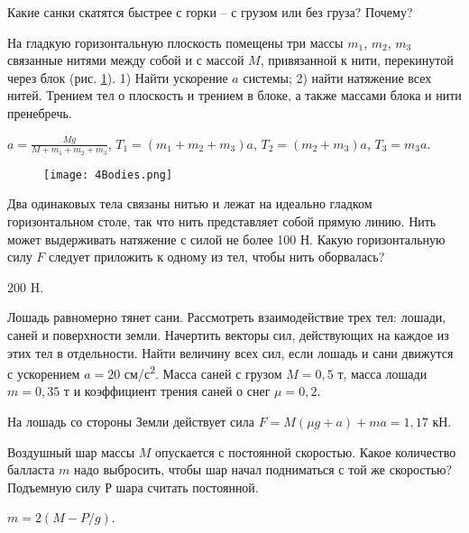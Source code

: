 \begin{ex} %
Какие санки скатятся быстрее с горки -- с грузом или без груза? Почему?
\end{ex}

\simpleProblems

\begin{ex} %
На гладкую горизонтальную плоскость помещены три массы $m_1$, $m_2$, $m_3$ связанные нитями между собой и с массой $M$, привязанной к нити, перекинутой через блок (рис. \ref{4Bodies}). 1) Найти ускорение $a$ системы; 2) найти натяжение всех нитей. Трением тел о плоскость и трением в блоке, а также массами блока и нити пренебречь.
\begin{ans}
$a = \frac{Mg}{M + m_1 +m_2 +m_3}$, $T_1 = (m_1 +m_2 +m_3)a$, $T_2 = (m_2 +m_3)a$, $T_3 = m_3 a$.
\end{ans}
\end{ex}

\begin{figure}[h]
\centering
\texttt{[image: 4Bodies.png]}
\caption{}
\label{4Bodies}
\end{figure}

\begin{ex} %
Два одинаковых тела связаны нитью и лежат на идеально гладком горизонтальном столе, так что нить представляет собой прямую линию. Нить может выдерживать натяжение с силой не более 100 Н. Какую горизонтальную силу $F$ следует приложить к одному из тел, чтобы нить оборвалась?
\begin{ans}
200 H.
\end{ans}
\end{ex}

\begin{ex} %
Лошадь равномерно тянет сани. Рассмотреть взаимодействие трех тел: лошади, саней и поверхности земли. Начертить векторы сил, действующих на каждое из этих тел в отдельности. Найти величину всех сил, если лошадь и сани движутся с ускорением $a = 20$ см/с\textsuperscript{2}. Масса саней с грузом $M = 0,5$ т, масса лошади $m = 0,35$ т и коэффициент трения саней о снег $\mu = 0,2$.
\begin{ans}
На лошадь со стороны Земли действует сила $F = M(\mu g + a) + ma = 1,17$ кН.
\end{ans}
\end{ex}

\begin{ex} %
Воздушный шар массы $M$ опускается с постоянной скоростью. Какое количество балласта $m$ надо выбросить, чтобы шар начал подниматься с той же скоростью? Подъемную силу $Р$ шара считать постоянной.
\begin{ans}
$m = 2(M - P/g)$.
\end{ans}
\end{ex}

